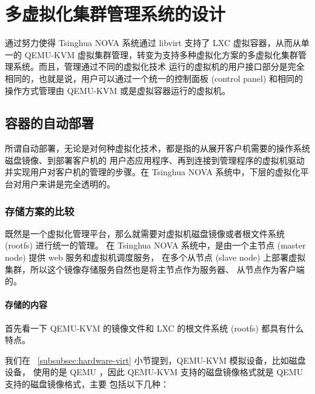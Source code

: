 \chapter{多虚拟化集群管理系统的设计}
\label{cha:multi-hypervisor-management-system}

通过努力使得 Tsinghua NOVA 系统通过 libvirt 支持了 LXC 虚拟容器，从而从单一的 QEMU-KVM
虚拟集群管理，转变为支持多种虚拟化方案的多虚拟化集群管理系统。而且，管理通过不同的虚拟化技术
运行的虚拟机的用户接口部分是完全相同的，也就是说，用户可以通过一个统一的控制面板 (control
panel) 和相同的操作方式管理由 QEMU-KVM 或是虚拟容器运行的虚拟机。

\section{容器的自动部署}
\label{sec:auto-deployment}

所谓自动部署，无论是对何种虚拟化技术，都是指的从展开客户机需要的操作系统磁盘镜像、到部署客户机的
用户态应用程序、再到连接到管理程序的虚拟机驱动并实现用户对客户机的管理的步骤。在 Tsinghua NOVA
系统中，下层的虚拟化平台对用户来讲是完全透明的。

\subsection{存储方案的比较}
\label{subsec:comparison-network-storage}

既然是一个虚拟化管理平台，那么就需要对虚拟机磁盘镜像或者根文件系统 (rootfs) 进行统一的管理。
在 Tsinghua NOVA 系统中，是由一个主节点 (master node) 提供 web 服务和虚拟机调度服务，
在多个从节点 (slave node) 上部署虚拟集群，所以这个镜像存储服务自然也是将主节点作为服务器、
从节点作为客户端的。

\subsubsection{存储的内容}

首先看一下 QEMU-KVM 的镜像文件和 LXC 的根文件系统 (rootfs) 都具有什么特点。


我们在 ~\ref{subsubsec:hardware-virt} 小节提到，QEMU-KVM 模拟设备，比如磁盘设备，
使用的是 QEMU ，因此 QEMU-KVM 支持的磁盘镜像格式就是 QEMU 支持的磁盘镜像格式，主要
包括以下几种：

